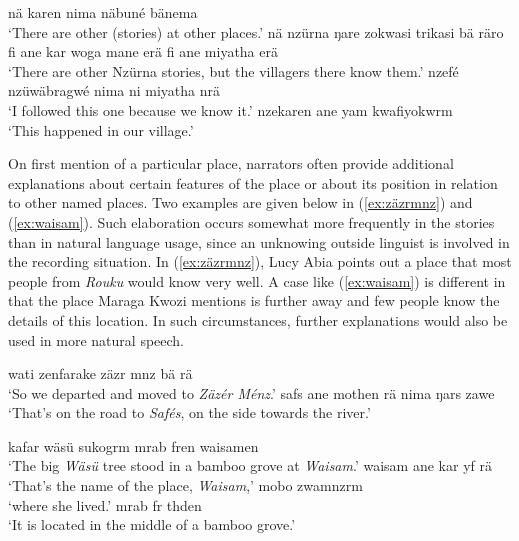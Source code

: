 \ea\label{ex:afterwordnzurna}
    \ea
        nä karen nima näbuné bänema\\
        \glt `There are other (stories) at other places.'
    \ex 
        nä nzürna ŋare zokwasi trikasi bä räro fi ane kar woga mane erä fi ane miyatha erä\\
        \glt `There are other Nzürna stories, but the villagers there know them.'
    \ex 
        nzefé nzüwäbragwé nima ni miyatha nrä\\
        \glt `I followed this one because we know it.'
    \ex 
        nzekaren ane yam kwafiyokwrm\\
        \glt `This happened in our village.'
\z
\z

On first mention of a particular place, narrators often provide additional explanations about certain features of the place or about its position in relation to other named places. Two examples are given below in (\ref{ex:zäzrmnz}) and (\ref{ex:waisam}). Such elaboration occurs somewhat more frequently in the stories than in natural language usage, since an unknowing outside linguist is involved in the recording situation. In (\ref{ex:zäzrmnz}), Lucy Abia points out a place that most people from \textit{Rouku} would know very well. A case like (\ref{ex:waisam}) is different in that the place Maraga Kwozi mentions is further away and few people know the details of this location. In such circumstances, further explanations would also be used in more natural speech.

\ea\label{ex:zäzrmnz}
    \ea
        wati zenfarake zäzr mnz bä rä\\
        \glt `So we departed and moved to \textit{Zäzér Ménz}.'
    \ex 
        safs ane mothen rä nima ŋars zawe\\
        \glt `That's on the road to \textit{Safés}, on the side towards the river.'
\z
\z

\ea\label{ex:waisam}
    \ea
        kafar wäsü sukogrm mrab fren waisamen\\
        \glt `The big \textit{Wäsü} tree stood in a bamboo grove at \textit{Waisam}.'
    \ex
        waisam ane kar yf rä\\
        \glt `That's the name of the place, \textit{Waisam},'
    \ex        
        mobo zwamnzrm\\
        \glt `where she lived.'
    \ex
        mrab fr thden\\
        \glt `It is located in the middle of a bamboo grove.'
\z
\z

